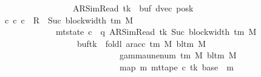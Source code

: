 \begin{isabellebody}
\ \ \ \ \ \ \ \ \ \ \ \ \ \ \ \ \ \ \ {\isacharparenleft}{\kern0pt}AR{\isacharunderscore}{\kern0pt}SimRead{\isacharcomma}{\kern0pt}\ tk{\isacharcomma}{\kern0pt}\ {}{\isacharcomma}{\kern0pt}\ buf{\isacharcomma}{\kern0pt}\ dvec{\isacharcomma}{\kern0pt}\ posk{\isacharparenright}{\kern0pt}{\isachardoublequoteclose}\isanewline
\ \ \ {\isachardoublequoteopen}{\isasymexists}c{\isacharprime}{\kern0pt}{\isacharprime}{\kern0pt}{\isachardot}{\kern0pt}\ {\isacharparenleft}{\kern0pt}c{\isacharprime}{\kern0pt}{\isacharcomma}{\kern0pt}\ c{\isacharprime}{\kern0pt}{\isacharprime}{\kern0pt}{\isacharparenright}{\kern0pt}\ {\isasymin}\ R{\isacharprime}{\kern0pt}\ {\isacharcircum}{\kern0pt}{\isacharcircum}{\kern0pt}\ Suc\ {\isacharparenleft}{\kern0pt}block{\isacharunderscore}{\kern0pt}width\ {\isacharparenleft}{\kern0pt}{\isasymGamma}{\isacharunderscore}{\kern0pt}tm\ M{\isacharparenright}{\kern0pt}{\isacharparenright}{\kern0pt}\isanewline
\ \ \ \ \ \ \ \ \ \ \ \ \ \ {\isasymand}\ mt{\isacharunderscore}{\kern0pt}state\ c{\isacharprime}{\kern0pt}{\isacharprime}{\kern0pt}\ {\isacharequal}{\kern0pt}\ {\isacharparenleft}{\kern0pt}q{\isacharcomma}{\kern0pt}\ AR{\isacharunderscore}{\kern0pt}SimRead{\isacharcomma}{\kern0pt}\ tk{\isacharcomma}{\kern0pt}\ Suc\ {\isacharparenleft}{\kern0pt}block{\isacharunderscore}{\kern0pt}width\ {\isacharparenleft}{\kern0pt}{\isasymGamma}{\isacharunderscore}{\kern0pt}tm\ M{\isacharparenright}{\kern0pt}{\isacharparenright}{\kern0pt}{\isacharcomma}{\kern0pt}\isanewline
\ \ \ \ \ \ \ \ \ \ \ \ \ \ \ \ \ \ \ \ buf{\isacharparenleft}{\kern0pt}tk\ {\isacharcolon}{\kern0pt}{\isacharequal}{\kern0pt}\ foldl\ {\isacharparenleft}{\kern0pt}ar{\isacharunderscore}{\kern0pt}acc\ {\isacharparenleft}{\kern0pt}{\isasymGamma}{\isacharunderscore}{\kern0pt}tm\ M{\isacharparenright}{\kern0pt}\ {\isacharparenleft}{\kern0pt}bl{\isacharunderscore}{\kern0pt}tm\ M{\isacharparenright}{\kern0pt}{\isacharparenright}{\kern0pt}\isanewline
\ \ \ \ \ \ \ \ \ \ \ \ \ \ \ \ \ \ \ \ \ \ \ \ \ \ \ \ \ \ {\isacharparenleft}{\kern0pt}gamma{\isacharunderscore}{\kern0pt}unenum\ {\isacharparenleft}{\kern0pt}{\isasymGamma}{\isacharunderscore}{\kern0pt}tm\ M{\isacharparenright}{\kern0pt}\ {\isacharparenleft}{\kern0pt}bl{\isacharunderscore}{\kern0pt}tm\ M{\isacharparenright}{\kern0pt}\ {}{\isacharparenright}{\kern0pt}\isanewline
\ \ \ \ \ \ \ \ \ \ \ \ \ \ \ \ \ \ \ \ \ \ \ \ \ \ \ \ \ \ {\isacharparenleft}{\kern0pt}map\ {\isacharparenleft}{\kern0pt}{\isasymlambda}m{\isachardot}{\kern0pt}\ mt{\isacharunderscore}{\kern0pt}tape\ c{\isacharprime}{\kern0pt}\ tk\ {\isacharparenleft}{\kern0pt}base\ {\isacharplus}{\kern0pt}\ m{\isacharparenright}{\kern0pt}{\isacharparenright}{\kern0pt}\isanewline

\end{isabellebody}
